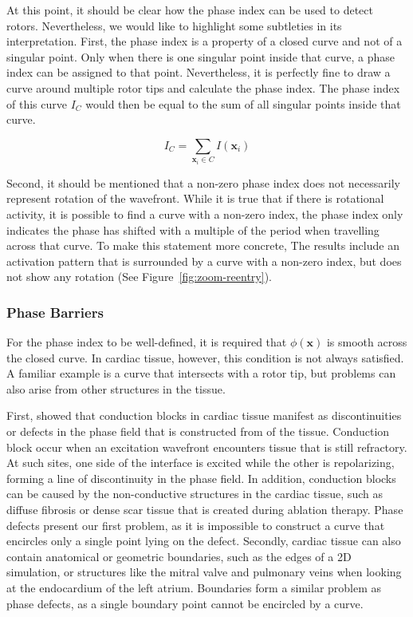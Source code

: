 \documentclass[twocolumn]{article}
\begin{document}
At this point, it should be clear how the phase index can be used to detect rotors.
Nevertheless, we would like to highlight some subtleties in its interpretation.
First, the phase index is a property of a closed curve
and not of a singular point.
Only when there is one singular point inside that curve,
a phase index can be assigned to that point.
Nevertheless, it is perfectly fine to draw a curve around multiple rotor tips
and calculate the phase index.
The phase index of this curve $I_C$ would then be equal to the sum of all singular points inside that curve.

\begin{equation}
  I_C = \sum_{\bm{x}_i\in C} I(\bm{x}_i)
  \label{eq:index-curve}
\end{equation}

Second, it should be mentioned that a non-zero phase index does not necessarily represent rotation of the wavefront.
While it is true that if there is rotational activity,
it is possible to find a curve with a non-zero index,
the phase index only indicates the phase has shifted with a multiple of the period
when travelling across that curve.
To make this statement more concrete,
The results include an activation pattern that is surrounded by a curve with a non-zero index,
but does not show any rotation (See Figure~\ref{fig:zoom-reentry}).

\subsubsection{Phase Barriers}

For the phase index to be well-defined,
it is required that $\phi(\bm{x})$ is smooth across the closed curve.
In cardiac tissue, however, this condition is not always satisfied.
A familiar example is a curve that intersects with a rotor tip,
but problems can also arise from other structures in the tissue.

First, \textcite{arno2021a} showed
that conduction blocks in cardiac tissue manifest
as discontinuities or defects in the phase field 
that is constructed from of the tissue.
Conduction block occur when an excitation wavefront encounters tissue that is still refractory.
At such sites, one side of the interface is excited while the other is repolarizing,
forming a line of discontinuity in the phase field.
In addition, conduction blocks can be caused by the non-conductive structures in the cardiac tissue,
such as diffuse fibrosis or dense scar tissue that is created during ablation therapy.
Phase defects present our first problem,
as it is impossible to construct a curve
that encircles only a single point lying on the defect.
Secondly, cardiac tissue can also contain anatomical or geometric boundaries,
such as the edges of a 2D simulation,
or structures like the mitral valve and pulmonary veins when looking at the endocardium of the left atrium.
Boundaries form a similar problem as phase defects,
as a single boundary point cannot be encircled by a curve.
\end{document}
